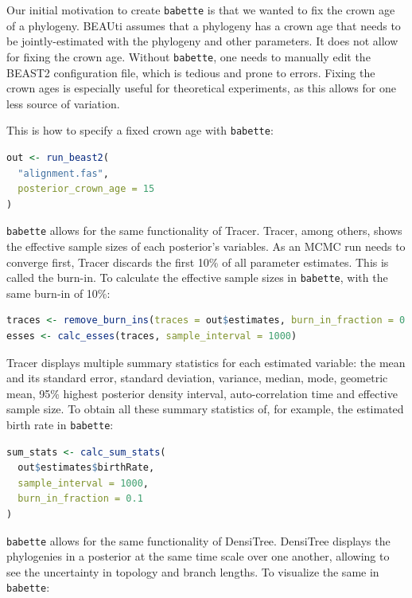 \documentclass{article}
\begin{document}
Our initial motivation to create \verb;babette; 
is that we wanted to fix the crown age of a phylogeny.
BEAUti assumes that a phylogeny has a crown age that needs to be jointly-estimated
with the phylogeny and other parameters. It does not allow for fixing
the crown age. Without \verb;babette;, one needs to manually edit the BEAST2 
configuration file, which is tedious and prone to errors. 
Fixing the crown ages is especially useful for theoretical experiments,
as this allows for one less source of variation.

This is how to specify a fixed crown age with \verb;babette;:

\begin{lstlisting}[language=R, floatplacement=H]
out <- run_beast2(
  "alignment.fas",
  posterior_crown_age = 15
)
\end{lstlisting}

\verb;babette; allows for the same functionality of Tracer. 
Tracer, among others, shows the effective sample
sizes of each posterior's variables. As an MCMC run needs to
converge first, Tracer discards the first 10\% of all parameter
estimates. This is called the burn-in. To calculate the effective
sample sizes in \verb;babette;, with the same burn-in of 10\%:

\begin{lstlisting}[language=R, floatplacement=H]
traces <- remove_burn_ins(traces = out$estimates, burn_in_fraction = 0.1)
esses <- calc_esses(traces, sample_interval = 1000)
\end{lstlisting}

Tracer displays multiple summary statistics for each
estimated variable: the mean and its standard error, standard deviation,
variance, median, mode, geometric mean, 95\% highest posterior density interval, 
auto-correlation time and effective sample size. To obtain all these summary statistics 
of, for example, the estimated birth rate in \verb;babette;:

\begin{lstlisting}[language=R, floatplacement=H]
sum_stats <- calc_sum_stats(
  out$estimates$birthRate, 
  sample_interval = 1000, 
  burn_in_fraction = 0.1
)
\end{lstlisting}

\verb;babette; allows for the same functionality of DensiTree.
DensiTree displays the phylogenies in a posterior at the same
time scale over one another, allowing to see the uncertainty in
topology and branch lengths. To visualize the same in \verb;babette;:
\end{document}
